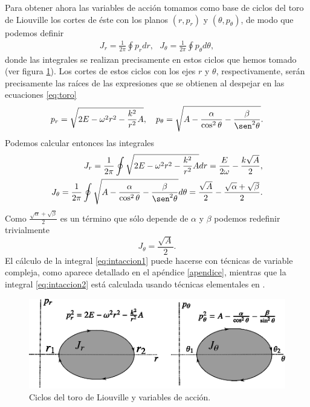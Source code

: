 \documentclass[11pt,a4paper,twoside]{article}
\theoremstyle{definition} \newtheorem{defn}[thm]{Definición}
\theoremstyle{definition} \newtheorem{ejemplo}[thm]{Ejemplo}
\theoremstyle{definition} \newtheorem{ejercicio}[thm]{Ejercicio}
\theoremstyle{remark} \newtheorem*{obs}{Observación}
\begin{document}
Para obtener ahora las variables de acción tomamos como base de ciclos del toro de Liouville los cortes de éste con los planos $(r,p_r)$ y $(\theta,p_{\theta})$, de modo que podemos definir
\begin{align}
    J_r=\frac{1}{2\pi}\oint p_r dr, \ \ \   J_\theta=\frac{1}{2\pi}\oint p_{\theta}d\theta,
\end{align}
donde las integrales se realizan precisamente en estos ciclos que hemos tomado (ver figura \ref{fig:ciclos}). Los cortes de estos ciclos con los ejes $r$ y $\theta$, respectivamente, serán precisamente las raíces de las expresiones que se obtienen al despejar en las ecuaciones \eqref{eq:toro} 
\begin{align}
    p_r=\sqrt{2E-\omega^2r^2-\frac{k^2}{r^2}A}, \ \ \    p_{\theta}=\sqrt{A-\frac{\alpha}{\cos^2\theta} -\frac{\beta}{\sen^2\theta}}.
\end{align}
Podemos calcular entonces las integrales
\begin{align}
  J_r=\frac{1}{2\pi}\oint \sqrt{2E-\omega^2r^2-\frac{k^2}{r^2}A} dr=\frac{E}{2\omega}-\frac{k\sqrt{A}}{2}, \label{eq:intaccion1} \\ 
  J_\theta=\frac{1}{2\pi}\oint \sqrt{A-\frac{\alpha}{\cos^2\theta} -\frac{\beta}{\sen^2\theta}}d\theta=\frac{\sqrt{A}}{2}-\frac{\sqrt{\alpha}+\sqrt{\beta}}{2}. 
\label{eq:intaccion2}
\end{align}
Como $\frac{\sqrt{\alpha}+\sqrt{\beta}}{2}$ es un término que sólo depende de $\alpha$ y $\beta$ podemos redefinir trivialmente 
\begin{equation}
  J_{\theta}=\frac{\sqrt{A}}{2}. 
\end{equation}
El cálculo de la integral \eqref{eq:intaccion1} puede hacerse con técnicas de variable compleja, como aparece detallado en el apéndice \ref{apendice}, mientras que la integral \eqref{eq:intaccion2} está calculada usando técnicas elementales en \cite{lechtenfeld}.

\begin{figure}[h]
  \centering
  \includegraphics[width=.7\textwidth]{ciclos}
  \caption{\small Ciclos del toro de Liouville y variables de acción.}
  \label{fig:ciclos}
\end{figure}
\end{document}

